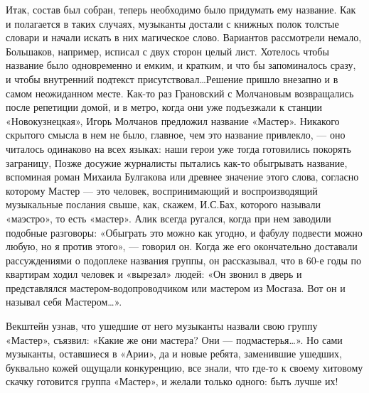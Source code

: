 \documentclass[16pt,a5paper,oneside]{book}
\begin{document}
Итак, состав был собран, теперь необходимо было придумать ему название. Как и полагается в таких случаях, музыканты
достали с книжных полок толстые словари и начали искать в них магическое слово. Вариантов рассмотрели немало, Большаков,
например, исписал с двух сторон целый лист. Хотелось чтобы название было одновременно и емким, и кратким, и что бы
запоминалось сразу, и чтобы внутренний подтекст присутствовал\ldots Решение пришло внезапно и в самом неожиданном месте.
Как-то раз Грановский с Молчановым возвращались после репетиции домой, и в метро, когда они уже подъезжали к станции
«Новокузнецкая», Игорь Молчанов предложил название «Мастер». Никакого скрытого смысла в нем не было, главное, чем это
название привлекло, — оно читалось одинаково на всех языках: наши герои уже тогда готовились покорять заграницу, Позже
досужие журналисты пытались как-то обыгрывать название, вспоминая роман Михаила Булгакова или древнее значение этого
слова, согласно которому Мастер — это человек, воспринимающий и воспроизводящий музыкальные послания свыше, как, скажем,
И.С.Бах, которого называли «маэстро», то есть «мастер». Алик всегда ругался, когда при нем заводили подобные разговоры:
«Обыграть это можно как угодно, и фабулу подвести можно любую, но я против этого», — говорил он. Когда же его
окончательно доставали рассуждениями о подоплеке названия группы, он рассказывал, что в 60-е годы по квартирам ходил
человек и «вырезал» людей: «Он звонил в дверь и представлялся мастером-водопроводчиком или мастером из Мосгаза. Вот он и
называл себя Мастером\ldots».

Векштейн узнав, что ушедшие от него музыканты назвали свою группу «Мастер», съязвил: «Какие же они мастера? Они —
подмастерья\ldots». Но сами музыканты, оставшиеся в «Арии», да и новые ребята, заменившие ушедших, буквально кожей
ощущали конкуренцию, все знали, что где-то к своему хитовому скачку готовится группа «Мастер», и желали только одного:
быть лучше их!
\end{document}
